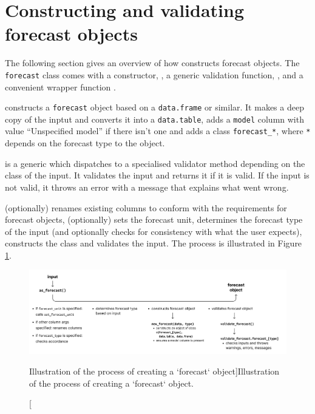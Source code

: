 \documentclass[
]{jss}
\begin{document}
\clearpage

\appendix
\renewcommand\thefigure{\thesection.\arabic{figure}}

\section{Constructing and validating forecast objects}

The following section gives an overview of how 
constructs forecast objects. The \texttt{forecast} class comes with a
constructor, , a generic validation function,
, and a convenient wrapper function
.

 constructs a \texttt{forecast} object based on a
\texttt{data.frame} or similar. It makes a deep copy of the inptut and
converts it into a \texttt{data.table}, adds a \texttt{model} column
with value ``Unspecified model'' if there isn't one and adds a class
\texttt{forecast\_*}, where \texttt{*} depends on the forecast type to
the object.

 is a generic which dispatches to a specialised
validator method depending on the class of the input. It validates the
input and returns it if it is valid. If the input is not valid, it
throws an error with a message that explains what went wrong.

 (optionally) renames existing columns to conform
with the requirements for forecast objects, (optionally) sets the
forecast unit, determines the forecast type of the input (and optionally
checks for consistency with what the user expects), constructs the class
and validates the input. The process is illustrated in Figure
\ref{fig:flowchart-validation}.

\begin{CodeChunk}
\begin{figure}[!h]

{\centering \includegraphics[width=1\linewidth]{output/flowchart-create-object} 

}

\caption[Illustration of the process of creating a `forecast` object]{Illustration of the process of creating a `forecast` object.}\label{fig:flowchart-validation}
\end{figure}
\end{CodeChunk}
\end{document}

